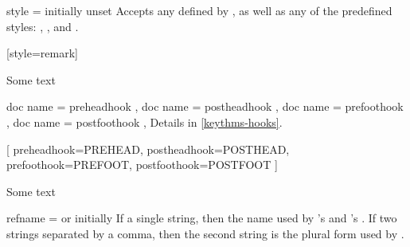 \documentclass{ltxdoc}
\begin{document}
\begin{docKey}{style}
  {=}
  {initially unset}
Accepts any  defined by , as well as any of the predefined  styles: , , and .

\begin{tcbwritetemp}
[style=remark]
\end{tcbwritetemp}

\begin{keythmscode}[withpreamble]
\begin{remark}
Some text
\end{remark}
\end{keythmscode}

\end{docKey}

\begin{docKeys}[
  doc parameter = {=\meta{code}},
  doc description = initially unset,
  ]
  {
    { doc name = preheadhook },
    { doc name = postheadhook },
    { doc name = prefoothook },
    { doc name = postfoothook },
  }
Details in \autoref{keythms-hooks}.

\begin{tcbwritetemp}
[
  preheadhook=PREHEAD,
  postheadhook=POSTHEAD,
  prefoothook=PREFOOT,
  postfoothook=POSTFOOT
]
\end{tcbwritetemp}

\begin{keythmscode}[withpreamble]
\begin{test}
Some text
\end{test}
\end{keythmscode}

\end{docKeys}

\begin{docKey}{refname}
  {= \textrm{or} }
  {initially }
If a single string, then the name used by 's  and 's .
If two strings separated by a comma, then the second string is the plural form used by .
\end{docKey}
\end{document}
